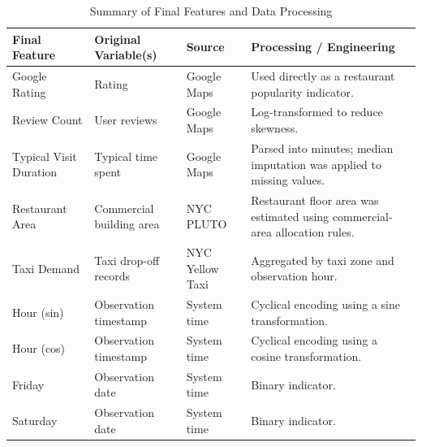 \documentclass[conference]{IEEEtran}
\begin{document}
\begin{table}[!t]
    \centering
    \caption{Summary of Final Features and Data Processing}
    \label{tab:feature_engineering}
    \footnotesize
    \setlength{\tabcolsep}{4pt}
    \renewcommand{\arraystretch}{1.15}

    \begin{tabularx}{\textwidth}{
        >{\raggedright\arraybackslash}p{2.8cm}
        >{\raggedright\arraybackslash}p{3.2cm}
        >{\raggedright\arraybackslash}p{2.5cm}
        >{\raggedright\arraybackslash}X
    }
        \toprule
        \textbf{Final Feature} &
        \textbf{Original Variable(s)} &
        \textbf{Source} &
        \textbf{Processing / Engineering} \\
        \midrule

        Google Rating &
        Rating &
        Google Maps &
        Used directly as a restaurant popularity indicator. \\

        Review Count &
        User reviews &
        Google Maps &
        Log-transformed to reduce skewness. \\

        Typical Visit Duration &
        Typical time spent &
        Google Maps &
        Parsed into minutes; median imputation was applied to missing values. \\

        Restaurant Area &
        Commercial building area &
        NYC PLUTO &
        Restaurant floor area was estimated using commercial-area allocation rules. \\

        Taxi Demand &
        Taxi drop-off records &
        NYC Yellow Taxi &
        Aggregated by taxi zone and observation hour. \\

        Hour (sin) &
        Observation timestamp &
        System time &
        Cyclical encoding using a sine transformation. \\

        Hour (cos) &
        Observation timestamp &
        System time &
        Cyclical encoding using a cosine transformation. \\

        Friday &
        Observation date &
        System time &
        Binary indicator. \\

        Saturday &
        Observation date &
        System time &
        Binary indicator. \\


\end{tabularx}
\end{table}
\end{document}
